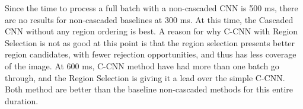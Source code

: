 Since the time to process a full batch with a non-cascaded CNN is 500 ms, there are no results for non-cascaded baselines at 300 ms.
At this time, the Cascaded CNN without any region ordering is best.
A reason for why C-CNN with Region Selection is not as good at this point is that the region selection presents better region candidates, with fewer rejection opportunities, and thus has less coverage of the image.
At 600 ms, C-CNN method have had more than one batch go through, and the Region Selection is giving it a lead over the simple C-CNN.
Both method are better than the baseline non-cascaded methods for this entire duration.
